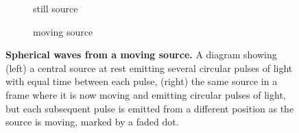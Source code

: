 \begin{figure}[h!]
	\centering
	\begin{subfigure}{0.45\textwidth}
		\centering
		\caption{still source}
		\label{subfig_1: doppler effect intro}
	\end{subfigure}
	\begin{subfigure}{0.45\textwidth}
		\centering
		\caption{moving source}
		\label{subfig_2: doppler effect intro}
	\end{subfigure}
	\caption{\textbf{Spherical waves from a moving source.} A diagram showing (left) a central source at rest emitting several circular pulses of light with equal time between each pulse, (right) the same source in a frame where it is now moving and emitting circular pulses of light, but each subsequent pulse is emitted from a different position as the source is moving, marked by a faded dot. }
	\label{fig: doppler effect intro}
\end{figure}

